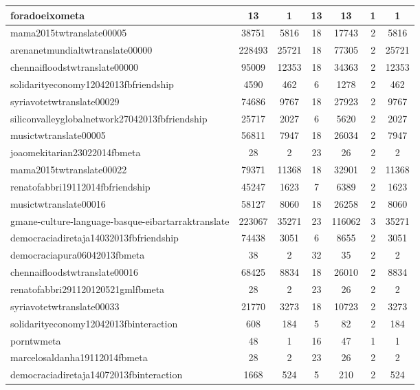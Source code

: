 \begin{table*}[h!]
\begin{center}
\begin{tabular}{| l | c | c | c | c | c | c |}
foradoeixometa & 13  & 1  & 13  & 13  & 1  & 1 \\\hline
mama2015twtranslate00005 & 38751  & 5816  & 18  & 17743  & 2  & 5816 \\\hline
arenanetmundialtwtranslate00000 & 228493  & 25721  & 18  & 77305  & 2  & 25721 \\\hline
chennaifloodstwtranslate00000 & 95009  & 12353  & 18  & 34363  & 2  & 12353 \\\hline
solidarityeconomy12042013fbfriendship & 4590  & 462  & 6  & 1278  & 2  & 462 \\\hline
syriavotetwtranslate00029 & 74686  & 9767  & 18  & 27923  & 2  & 9767 \\\hline
siliconvalleyglobalnetwork27042013fbfriendship & 25717  & 2027  & 6  & 5620  & 2  & 2027 \\\hline
musictwtranslate00005 & 56811  & 7947  & 18  & 26034  & 2  & 7947 \\\hline
joaomekitarian23022014fbmeta & 28  & 2  & 23  & 26  & 2  & 2 \\\hline
mama2015twtranslate00022 & 79371  & 11368  & 18  & 32901  & 2  & 11368 \\\hline
renatofabbri19112014fbfriendship & 45247  & 1623  & 7  & 6389  & 2  & 1623 \\\hline
musictwtranslate00016 & 58127  & 8060  & 18  & 26258  & 2  & 8060 \\\hline
gmane-culture-language-basque-eibartarraktranslate & 223067  & 35271  & 23  & 116062  & 3  & 35271 \\\hline
democraciadiretaja14032013fbfriendship & 74438  & 3051  & 6  & 8655  & 2  & 3051 \\\hline
democraciapura06042013fbmeta & 38  & 2  & 32  & 35  & 2  & 2 \\\hline
chennaifloodstwtranslate00016 & 68425  & 8834  & 18  & 26010  & 2  & 8834 \\\hline
renatofabbri291120120521gmlfbmeta & 28  & 2  & 23  & 26  & 2  & 2 \\\hline
syriavotetwtranslate00033 & 21770  & 3273  & 18  & 10723  & 2  & 3273 \\\hline
solidarityeconomy12042013fbinteraction & 608  & 184  & 5  & 82  & 2  & 184 \\\hline
porntwmeta & 48  & 1  & 16  & 47  & 1  & 1 \\\hline
marcelosaldanha19112014fbmeta & 28  & 2  & 23  & 26  & 2  & 2 \\\hline
democraciadiretaja14072013fbinteraction & 1668  & 524  & 5  & 210  & 2  & 524 \\\hline

\end{tabular}
\end{center}
\end{table*}
